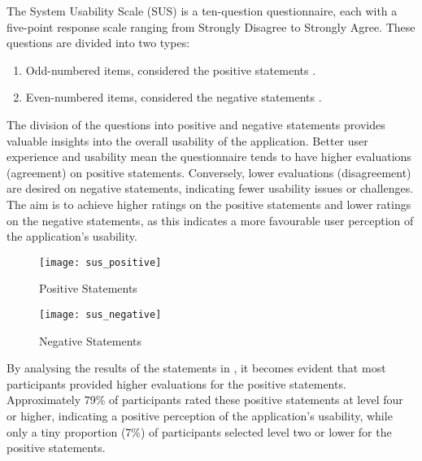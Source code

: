 The System Usability Scale (SUS) is a ten-question questionnaire, each with a
five-point response scale ranging from Strongly Disagree to Strongly Agree.
These questions are divided into two types:

\begin{enumerate}
  \item Odd-numbered items, considered the positive statements
    .
  \item Even-numbered items, considered the negative statements
    .
\end{enumerate}

The division of the questions into positive and negative statements provides
valuable insights into the overall usability of the application. Better user
experience and usability mean the questionnaire tends to have higher
evaluations (agreement) on positive statements. Conversely, lower evaluations
(disagreement) are desired on negative statements, indicating fewer usability
issues or challenges. The aim is to achieve higher ratings on the positive
statements and lower ratings on the negative statements, as this indicates a
more favourable user perception of the application's usability.

\begin{figure*}[!htb]
  \caption{Statements Results SUS}
  \label{fig:statements_results_sus}
  \centering
  \begin{subfigure}[b]{1\textwidth}
    \caption{Positive Statements}
    \label{fig:statements_results_sus_positive}
    \texttt{[image: sus\_positive]}
  \end{subfigure}
  \hfill
  \begin{subfigure}[b]{1\textwidth}
    \caption{Negative Statements}
    \label{fig:statements_results_sus_negative}
    \texttt{[image: sus\_negative]}
  \end{subfigure}
\end{figure*}

By analysing the results of the statements in
, it becomes evident that most participants
provided higher evaluations for the positive statements. Approximately 79\% of
participants rated these positive statements at level four or higher,
indicating a positive perception of the application's usability, while only a
tiny proportion (7\%) of participants selected level two or lower for the
positive statements.

